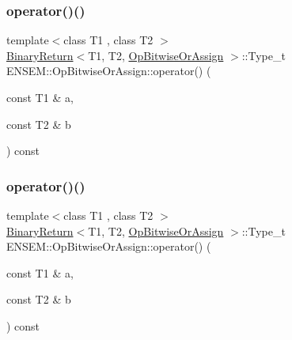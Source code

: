 \subsubsection{\texorpdfstring{operator()()}{operator()()}\hspace{0.1cm}{\footnotesize\ttfamily [1/3]}}
{\footnotesize\ttfamily template$<$class T1 , class T2 $>$ \\
\mbox{\hyperlink{structENSEM_1_1BinaryReturn}{Binary\+Return}}$<$T1, T2, \mbox{\hyperlink{structENSEM_1_1OpBitwiseOrAssign}{Op\+Bitwise\+Or\+Assign}} $>$\+::Type\+\_\+t E\+N\+S\+E\+M\+::\+Op\+Bitwise\+Or\+Assign\+::operator() (\begin{DoxyParamCaption}\item[{const T1 \&}]{a,  }\item[{const T2 \&}]{b }\end{DoxyParamCaption}) const\hspace{0.3cm}{\ttfamily [inline]}}

\mbox{\label{structENSEM_1_1OpBitwiseOrAssign_afddd4ba26f5d21bc671df619c5c4e33b}} 
\subsubsection{\texorpdfstring{operator()()}{operator()()}\hspace{0.1cm}{\footnotesize\ttfamily [2/3]}}
{\footnotesize\ttfamily template$<$class T1 , class T2 $>$ \\
\mbox{\hyperlink{structENSEM_1_1BinaryReturn}{Binary\+Return}}$<$T1, T2, \mbox{\hyperlink{structENSEM_1_1OpBitwiseOrAssign}{Op\+Bitwise\+Or\+Assign}} $>$\+::Type\+\_\+t E\+N\+S\+E\+M\+::\+Op\+Bitwise\+Or\+Assign\+::operator() (\begin{DoxyParamCaption}\item[{const T1 \&}]{a,  }\item[{const T2 \&}]{b }\end{DoxyParamCaption}) const\hspace{0.3cm}{\ttfamily [inline]}}

\mbox{\label{structENSEM_1_1OpBitwiseOrAssign_afddd4ba26f5d21bc671df619c5c4e33b}} 
